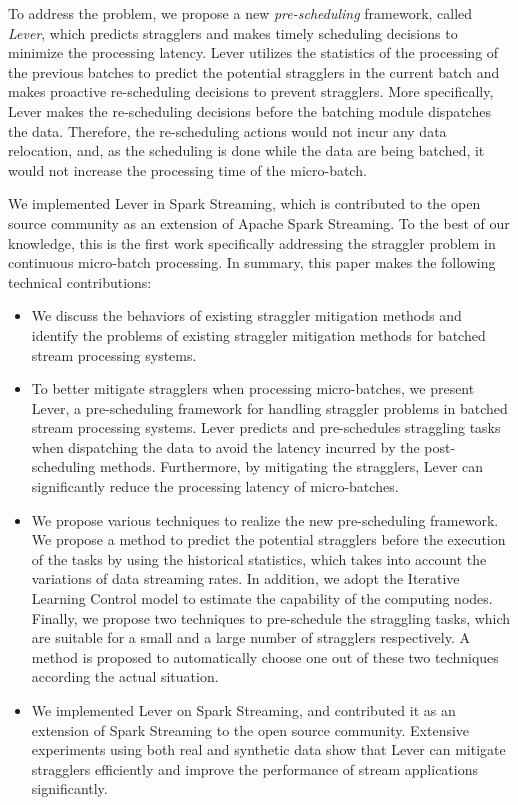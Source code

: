 \documentclass[10pt,conference,compsocconf,letterpaper]{IEEEtran}
\begin{document}
  To address the problem, we propose a new \emph{pre-scheduling} framework, called \emph{Lever}, which predicts stragglers and makes timely scheduling decisions to minimize the processing latency. Lever utilizes the statistics of the processing of the previous batches to predict the potential stragglers in the current batch and makes proactive re-scheduling decisions to prevent stragglers. More specifically, Lever makes the re-scheduling decisions before the batching module dispatches the data. Therefore, the re-scheduling actions would not incur any data relocation, and, as the scheduling is done while the data are being batched, it would not increase the processing time of the micro-batch.

  We implemented Lever in Spark Streaming, which is contributed to the open source community as an extension of Apache Spark Streaming. To the best of our knowledge, this is the first work specifically addressing the straggler problem in continuous micro-batch processing. In summary, this paper makes the following technical contributions:

\begin{itemize}
  \item We discuss the behaviors of existing straggler mitigation methods and identify the problems of existing straggler mitigation methods for batched stream processing systems.

  \item To better mitigate stragglers when processing micro-batches, we present Lever, a pre-scheduling framework for handling straggler problems in batched stream processing systems. Lever predicts and pre-schedules straggling tasks when dispatching the data to avoid the latency incurred by the post-scheduling methods. Furthermore, by mitigating the stragglers, Lever can significantly reduce the processing latency of micro-batches.

  \item We propose various techniques to realize the new pre-scheduling framework. We propose a method to predict the potential stragglers before the execution of the tasks by using the historical statistics, which takes into account the variations of data streaming rates. In addition, we adopt the Iterative Learning Control model to estimate the capability of the computing nodes. Finally, we propose two techniques to pre-schedule the straggling tasks, which are suitable for a small and a large number of stragglers respectively. A method is proposed to automatically choose one out of these two techniques according the actual situation.

  \item We implemented Lever on Spark Streaming, and contributed it as an extension of Spark Streaming to the open source community. Extensive experiments using both real and synthetic data show that Lever can mitigate stragglers efficiently and improve the performance of stream applications significantly.
\end{itemize}
\end{document}
